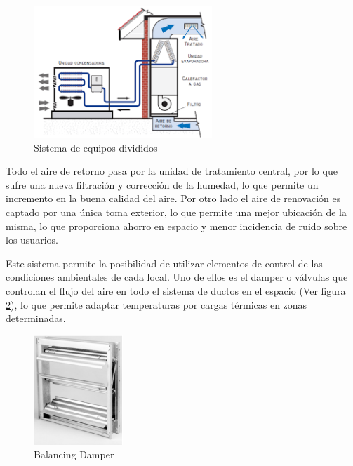 \begin{figure}[H]
    \centering
    \includegraphics[width=0.60\textwidth]{2_MainMatter/Capitulo2/Imagenes/sistemaenestudio.PNG}
    \caption{Sistema de equipos divididos\cite{Sistemadividido}}
    \label{fig:sistemaenestudio}
\end{figure}

Todo el aire de retorno pasa por la unidad de tratamiento central, por
lo que sufre una nueva filtración y corrección de la humedad, lo que
permite un incremento en la buena calidad del aire. Por otro lado el aire de renovación es captado por una única toma exterior, lo que permite una mejor ubicación de la misma, lo que proporciona ahorro en espacio y menor incidencia de ruido sobre los usuarios.

Este sistema permite la posibilidad de utilizar elementos de control
de las condiciones ambientales de cada local. Uno de ellos es el
damper o válvulas que controlan el flujo del aire en todo el sistema
de ductos en el espacio (Ver figura \ref{fig:ejemplodamper}), lo que permite adaptar temperaturas por cargas térmicas en zonas determinadas.

\begin{figure}[H]
    \centering
    \includegraphics[width=0.30\textwidth]{2_MainMatter/Capitulo2/Imagenes/ejemplodamper.PNG}
    \caption{Balancing Damper\cite{Dampers}}
    \label{fig:ejemplodamper}
\end{figure}

